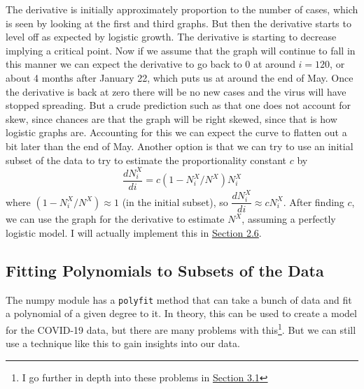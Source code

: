 \documentclass{report}
\begin{document}
            The derivative is initially approximately proportion to the number of cases, which is seen by looking at the first and third graphs. But then the derivative starts to level off as expected by logistic growth. The derivative is starting to decrease implying a critical point. Now if we assume that the graph will continue to fall in this manner we can expect the derivative to go back to 0 at around $i=120$, or about 4 months after January 22, which puts us at around the end of May. Once the derivative is back at zero there will be no new cases and the virus will have stopped spreading. But a crude prediction such as that one does not account for skew, since chances are that the graph will be right skewed, since that is how logistic graphs are. Accounting for this we can expect the curve to flatten out a bit later than the end of May. 
            \newline
            \indent Another option is that we can try to use an initial subset of the data to try to estimate the proportionality constant $c$ by
            \begin{equation}
                \dfrac{dN^X_i}{di} = c(1 - N^X_i/N^X)N^X_i
            \end{equation}
            where $(1 - N^X_i/N^X) \approx 1$ (in the initial subset), so $\dfrac{dN^X_i}{di} \approx cN^X_i$. After finding $c$, we can use the graph for the derivative to estimate $N^X$, assuming a perfectly logistic model. I will actually implement this in \hyperref[sec:auto]{Section 2.6}.
        \subsection{Fitting Polynomials to Subsets of the Data}
            The numpy module has a \lstinline{polyfit} method that can take a bunch of data and fit a polynomial of a given degree to it. In theory, this can be used to create a model for the COVID-19 data, but there are many problems with this\footnote{I go further in depth into these problems in \hyperref[sec:problems]{Section 3.1}}. But we can still use a technique like this to gain insights into our data.
\end{document}
